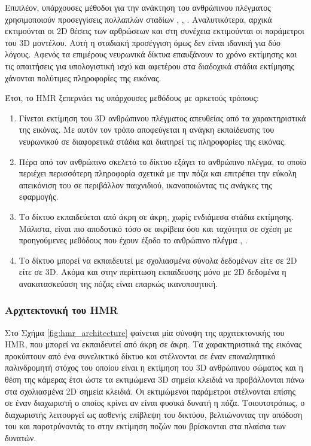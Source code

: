 Επιπλέον, υπάρχουσες μέθοδοι για την ανάκτηση του ανθρώπινου πλέγματος χρησιμοποιούν προσεγγίσεις πολλαπλών σταδίων \cite{keep_it_smpl_paper}, \cite{unite_the_people}, \cite{estimate_from_single_color_paper}. Αναλυτικότερα, αρχικά εκτιμούνται οι 2D θέσεις των αρθρώσεων και στη συνέχεια εκτιμούνται οι παράμετροι του 3D μοντέλου. Αυτή η σταδιακή προσέγγιση όμως δεν είναι ιδανική για δύο λόγους. Αφενός τα επιμέρους νευρωνικά δίκτυα επαυξάνουν το χρόνο εκτίμησης και τις απαιτήσεις για υπολογιστική ισχύ και αφετέρου στα διαδοχικά στάδια εκτίμησης χάνονται πολύτιμες πληροφορίες της εικόνας.

Έτσι, το HMR ξεπερνάει τις υπάρχουσες μεθόδους με αρκετούς τρόπους:

\begin{enumerate}
	\item Γίνεται εκτίμηση του 3D ανθρώπινου πλέγματος απευθείας από τα χαρακτηριστικά της εικόνας. Με αυτόν τον τρόπο αποφεύγεται η ανάγκη εκπαίδευσης του νευρωνικού σε διαφορετικά στάδια και διατηρεί τις πληροφορίες της εικόνας.
	\item Πέρα από τον ανθρώπινο σκελετό το δίκτυο εξάγει το ανθρώπινο πλέγμα, το οποίο περιέχει περισσότερη πληροφορία σχετικά με την πόζα και επιτρέπει την εύκολη απεικόνιση του σε περιβάλλον παιχνιδιού, ικανοποιώντας τις ανάγκες της εφαρμογής.
	\item Το δίκτυο εκπαιδεύεται από άκρη σε άκρη, χωρίς ενδιάμεσα στάδια εκτίμησης. Μάλιστα, είναι πιο αποδοτικό τόσο σε ακρίβεια όσο και ταχύτητα σε σχέση με προηγούμενες μεθόδους που έχουν έξοδο το ανθρώπινο πλέγμα \cite{unite_the_people}, \cite{keep_it_smpl_paper}.
	\item Το δίκτυο μπορεί να εκπαιδευτεί με σχολιασμένα σύνολα δεδομένων είτε σε 2D είτε σε 3D. Ακόμα και στην περίπτωση εκπαίδευσης μόνο με 2D δεδομένα η ανακατασκεύαση της πόζας είναι επαρκώς ικανοποιητική.
\end{enumerate}

\subsubsection{Αρχιτεκτονική του HMR}
Στο Σχήμα \ref{fig:hmr_architecture} φαίνεται μία σύνοψη της αρχιτεκτονικής του HMR, που μπορεί να εκπαιδευτεί από άκρη σε άκρη. Τα χαρακτηριστικά της εικόνας προκύπτουν από ένα συνελικτικό δίκτυο και στέλνονται σε έναν επαναληπτικό παλινδρομητή στόχος του οποίου είναι η εκτίμηση του 3D ανθρώπινου σώματος και η θέση της κάμερας έτσι ώστε τα εκτιμώμενα 3D σημεία κλειδιά να προβάλλονται πάνω στα σχολιασμένα 2D σημεία κλειδιά. Οι εκτιμώμενοι παράμετροι στέλνονται επίσης σε έναν διαχωριστή ο οποίος κρίνει αν είναι φυσικά δυνατή η πόζα. Τοιουτοτρόπως, ο διαχωριστής λειτουργεί ως ασθενής επίβλεψη του δικτύου, βελτιώνοντας την απόδοση του και παροτρύνοντάς το στην εκτίμηση ποζών που βρίσκονται στα πλαίσια των δυνατών.

